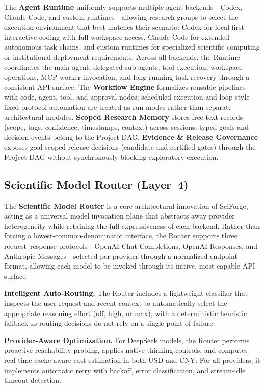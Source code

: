 \documentclass[sn-basic,Numbered,pdflatex]{sn-jnl}
\begin{document}
The \textbf{Agent Runtime} uniformly supports multiple agent backends---Codex, Claude Code, and custom runtimes---allowing research groups to select the execution environment that best matches their scenario: Codex for local-first interactive coding with full workspace access, Claude Code for extended autonomous task chains, and custom runtimes for specialized scientific computing or institutional deployment requirements. Across all backends, the Runtime coordinates the main agent, delegated sub-agents, tool execution, workspace operations, MCP worker invocation, and long-running task recovery through a consistent API surface. The \textbf{Workflow Engine} formalizes reusable pipelines with code, agent, tool, and approval nodes; scheduled execution and loop-style fixed protocol automation are treated as run modes rather than separate architectural modules. \textbf{Scoped Research Memory} stores free-text records (scope, tags, confidence, timestamps, context) across sessions; typed goals and decision events belong to the Project DAG. \textbf{Evidence \& Release Governance} exposes goal-scoped release decisions (candidate and certified gates) through the Project DAG without synchronously blocking exploratory execution.


\subsection{Scientific Model Router (Layer~4)}
The \textbf{Scientific Model Router} is a core architectural innovation of SciForge, acting as a universal model invocation plane that abstracts away provider heterogeneity while retaining the full expressiveness of each backend. Rather than forcing a lowest-common-denominator interface, the Router supports three request--response protocols---OpenAI Chat Completions, OpenAI Responses, and Anthropic Messages---selected per provider through a normalized endpoint format, allowing each model to be invoked through its native, most capable API surface.

\textbf{Intelligent Auto-Routing.} The Router includes a lightweight classifier that inspects the user request and recent context to automatically select the appropriate reasoning effort (off, high, or max), with a deterministic heuristic fallback so routing decisions do not rely on a single point of failure.

\textbf{Provider-Aware Optimization.} For DeepSeek models, the Router performs proactive reachability probing, applies native thinking controls, and computes real-time cache-aware cost estimation in both USD and CNY. For all providers, it implements automatic retry with backoff, error classification, and stream-idle timeout detection.
\end{document}
